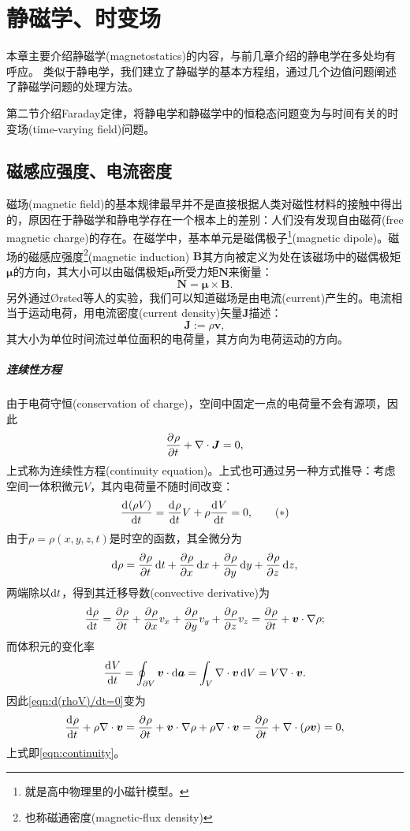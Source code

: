 \chapter{静磁学、时变场}
\label{chap:magnetostatics}
本章主要介绍静磁学(magnetostatics)的内容，与前几章介绍的静电学在多处均有呼应。%
类似于静电学，我们建立了静磁学的基本方程组，通过几个边值问题阐述了静磁学问题的处理方法。%

第二节介绍Faraday定律，将静电学和静磁学中的恒稳态问题变为与时间有关的时变场(time-varying field)问题。

\section{磁感应强度、电流密度}
\label{sec:introduction to magnetostatics}

磁场(magnetic field)的基本规律最早并不是直接根据人类对磁性材料的接触中得出的，原因在于静磁学和静电学存在一个根本上的差别：人们没有发现自由磁荷(free magnetic charge)的存在。在磁学中，基本单元是磁偶极子\footnote{就是高中物理里的小磁针模型。}(magnetic dipole)。磁场的磁感应强度\footnote{也称磁通密度(magnetic-flux density)}(magnetic induction) $\bm B$其方向被定义为处在该磁场中的磁偶极矩$\bm\mu$的方向，其大小可以由磁偶极矩$\bm\mu$所受力矩$\bm N$来衡量：
\begin{equation}
    \bm N=\bm\mu\times\bm B.
\end{equation}
另外通过Ørsted等人的实验，我们可以知道磁场是由电流(current)产生的。电流相当于运动电荷，用电流密度(current density)矢量$\bm J$描述：
\begin{equation}
    \bm J:=\rho\bm v,
\end{equation}
其大小为单位时间流过单位面积的电荷量，其方向为电荷运动的方向。
\paragraph{连续性方程}
由于电荷守恒(conservation of charge)，空间中固定一点的电荷量不会有源项，因此
\begin{equation}
    \label{eqn:continuity}
    \frac{\partial^{{}}\rho}{\partial{t}^{{}}}+\nabla\cdot\bm J=0,
\end{equation}
上式称为连续性方程(continuity equation)。上式也可通过另一种方式推导：考虑空间一体积微元$V$，其内电荷量不随时间改变：
\begin{equation*}
    \label{eqn:d(rhoV)/dt=0}
    \frac{\mathrm{d}^{{}}(\rho V)}{\mathrm{d}{t}^{{}}}=\frac{\mathrm{d}^{{}}\rho}{\mathrm{d}{t}^{{}}}V+\rho\frac{\mathrm{d}^{{}}V}{\mathrm{d}{t}^{{}}}=0,\tag{$\ast$}
\end{equation*}
由于$\rho=\rho(x,y,z,t)$是时空的函数，其全微分为
\[
    \mathop{}\!\mathrm{d}\rho=\frac{\partial^{{}}\rho}{\partial{t}^{{}}}\mathop{}\!\mathrm{d} t+\frac{\partial^{{}}\rho}{\partial{x}^{{}}}\mathop{}\!\mathrm{d} x+\frac{\partial^{{}}\rho}{\partial{y}^{{}}}\mathop{}\!\mathrm{d} y+\frac{\partial^{{}}\rho}{\partial{z}^{{}}}\mathop{}\!\mathrm{d} z,
\]
两端除以$\mathop{}\!\mathrm{d} t$，得到其迁移导数(convective derivative)为
\[
    \frac{\mathrm{d}^{{}}\rho}{\mathrm{d}{t}^{{}}}=\frac{\partial^{{}}\rho}{\partial{t}^{{}}}+\frac{\partial^{{}}\rho}{\partial{x}^{{}}}v_x+\frac{\partial^{{}}\rho}{\partial{y}^{{}}}v_y+\frac{\partial^{{}}\rho}{\partial{z}^{{}}}v_z=\frac{\partial^{{}}\rho}{\partial{t}^{{}}}+\bm v\cdot\nabla\rho;
\]
而体积元的变化率
\[
    \frac{\mathrm{d}^{{}}V}{\mathrm{d}{t}^{{}}}=\oint_{\partial V}\bm v\cdot\mathop{}\!\mathrm{d}\bm a=\int_V\nabla\cdot\bm v\mathop{}\!\mathrm{d} V=V\nabla\cdot\bm v.
\]
因此\eqref{eqn:d(rhoV)/dt=0}变为
\[
    \frac{\mathrm{d}^{{}}\rho}{\mathrm{d}{t}^{{}}}+\rho\nabla\cdot\bm v=\frac{\partial^{{}}\rho}{\partial{t}^{{}}}+\bm v\cdot\nabla\rho+\rho\nabla\cdot\bm v=\frac{\partial^{{}}\rho}{\partial{t}^{{}}}+\nabla\cdot(\rho\bm v)=0,
\]
上式即\eqref{eqn:continuity}。
